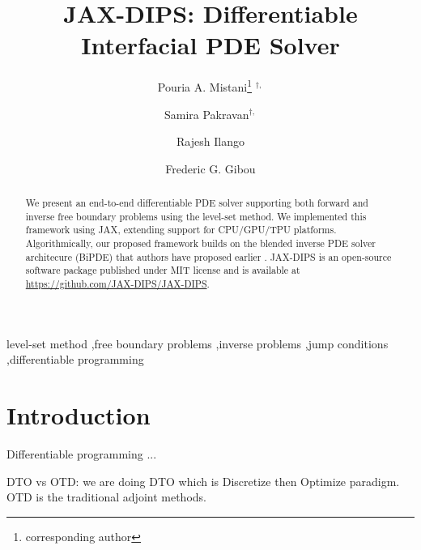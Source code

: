 \documentclass{elsarticle}
\begin{document}
\title{JAX-DIPS: Differentiable Interfacial PDE Solver}



\author[1]{Pouria A. Mistani\thanks{corresponding author} $^{\dagger,}$}
\author[2]{Samira Pakravan$^{\dagger,}$}
\author[1]{Rajesh Ilango}
\author[2]{Frederic G. Gibou}

\address[1]{NVIDIA Corporation, Santa Clara, CA 95051, USA}
\address[2]{University of California, Santa Barbara, CA 93106-5070, USA}

\begin{abstract}
	We present an end-to-end differentiable PDE solver supporting both forward and inverse free boundary problems using the level-set method. We implemented this framework using JAX, extending support for CPU/GPU/TPU platforms. Algorithmically, our proposed framework builds on the blended inverse PDE solver architecure (BiPDE) that authors have proposed earlier \cite{pakravan2021solving}. JAX-DIPS is an open-source software package published under MIT license and is available at \href{https://github.com/JAX-DIPS/JAX-DIPS}{https://github.com/JAX-DIPS/JAX-DIPS}.

\end{abstract}

\begin{keyword}
	level-set method \sep free boundary problems \sep inverse problems \sep jump conditions \sep differentiable programming
\end{keyword}

\maketitle
\def\thefootnote{$\dagger$}







\section{Introduction}
\label{sec::introduction}
Differentiable programming ...

DTO vs OTD: we are doing DTO which is Discretize then Optimize paradigm. OTD is the traditional adjoint methods.
\end{document}
